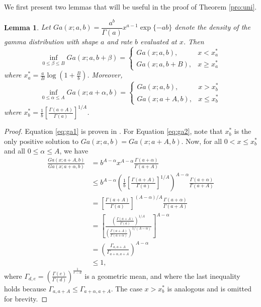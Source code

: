 \documentclass[12pt]{article}
\newtheorem{lemma}{Lemma}[section]
\begin{document}
We first present two lemmas that will be useful in the proof of Theorem \ref{pro:uni}.
\begin{lemma}
	\label{pro:ga1}
	Let $Ga(x;a,b) = \dfrac{a^b}{\Gamma(a)}x^{a-1}\exp\{-ab\}$ denote the density of the gamma distribution with shape $a$ and rate $b$ evaluated at $x$. Then
	\begin{equation}
		\label{eq:ga1}
		\inf_{0\le \beta\le B} Ga(x;a,b+\beta) = 
		\begin{cases}
			Ga(x;a,b), & x<x_a^* \\ Ga(x;a,b+B), & x\ge x_a^*
		\end{cases}
	\end{equation}	
	where $x_a^*=\frac{a}{B}\log\left( 1+\frac{B}{b}\right) $. Moreover,
	\begin{equation}
		\label{eq:ga2}
		\inf_{0\le \alpha\le A} Ga(x;a+\alpha,b) = 
		\begin{cases}
			Ga(x;a,b), & x>x_b^* \\ Ga(x;a+A,b), & x\le x_b^*
		\end{cases}
	\end{equation}
	where $x_b^*=\frac{1}{b}\left[ \frac{\Gamma(a+A)}{\Gamma(a)}\right]^{1/A}$. 
\end{lemma}
\begin{proof}
	Equation \eqref{eq:ga1} is proven in \cite{Jones.2004}. For Equation \eqref{eq:ga2}, note that $x_b^*$ is the only positive solution to $Ga(x;a,b) = Ga(x;a+A,b)$. Now, for all $0<x\le x_b^*$ and all $0\le\alpha\le A$, we have
	\begin{align*}
		\frac{Ga(x;a+A,b)}{Ga(x;a+\alpha,b)}
		& = b^{A-\alpha}x^{A-\alpha} \frac{\Gamma(a+\alpha)}{\Gamma(a+A)} \\
		& \le b^{A-\alpha}\left(\frac{1}{b}\left[ \frac{\Gamma(a+A)}{\Gamma(a)}\right]^{1/A} \right)^{A-\alpha} \frac{\Gamma(a+\alpha)}{\Gamma(a+A)} \\
		& = \left[ \frac{\Gamma(a+A)}{\Gamma(a)}\right]^{(A-\alpha)/A} \frac{\Gamma(a+\alpha)}{\Gamma(a+A)} \\
		& = \left[
		\frac{\left(\frac{\Gamma(a+A)}{\Gamma(a)}\right)^{1/A}}{\left(\frac{\Gamma(a+A)}{\Gamma(a+\alpha)}\right)^{1/(A-\alpha)}}
		\right]^{A-\alpha} \\
		& = \left( \frac{\Gamma_{a,a+A}}{\Gamma_{a+\alpha, a+A}}\right)^{A-\alpha} \\
		& \le 1,
	\end{align*}
	where $\Gamma_{d,e} = \left( \frac{\Gamma(e)}{\Gamma(d)} \right)^{\frac{1}{e-d}}$ is a geometric mean,
	and where the last inequality holds because $\Gamma_{a,a+A}\le\Gamma_{a+\alpha, a+A}$.
	The case $x>x_b^*$ is analogous and is omitted for brevity.
\end{proof}
\end{document}
